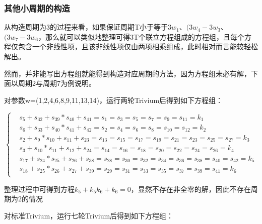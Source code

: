 \subsubsection{其他小周期的构造}

从构造周期为3的过程来看，如果保证周期T小于等于$3w_{1}$、$(3w_{4}-3w_{3}$、$(3w_{7}-3w_{6}$，那么就可以类似地整理可得3T个联立方程组成的方程组，且每个方程仅包含一个非线性项，且该非线性项仅由两项相乘组成，此时相对而言能较轻松解出。

然而，并非能写出方程组就能得到构造对应周期的方法，因为方程组未必有解，下面以周期2与周期7为例说明。

\vspace{3ex}

对参数w=(1,2,4,6,8,9,11,13,14)，运行两轮Trivium后得到如下方程组：

\begin{equation}
\left\{
\begin{aligned}
&s_{5}+s_{32}+s_{39}*s_{40}+s_{41}=s_{1}=s_{3}=s_{5}=s_{7}=s_{9}=s_{11}=k_{1}\\
&s_{6}+s_{33}+s_{40}*s_{41}+s_{42}=s_{2}=s_{4}=s_{6}=s_{8}=s_{10}=s_{12}=k_{2}\\
&s_{2}+s_{9}*s_{10}+s_{11}+s_{23}=s_{13}=s_{15}=s_{17}=s_{19}=s_{21}=s_{23}=s_{25}=s_{27}=k_{3}\\
&s_{3}+s_{10}*s_{11}+s_{12}+s_{24}=s_{14}=s_{16}=s_{18}=s_{20}=s_{22}=s_{24}=s_{26}=k_{4}\\
&s_{17}+s_{24}*s_{25}+s_{26}+s_{38}=s_{28}=s_{30}=s_{32}=s_{34}=s_{36}=s_{38}=s_{40}=s_{42}=k_{5}\\
&s_{18}+s_{25}*s_{26}+s_{27}+s_{39}=s_{29}=s_{31}=s_{33}=s_{35}=s_{37}=s_{39}=s_{41}=k_{6}\\
\end{aligned}
\right.
\end{equation}

整理过程中可得到方程$k_{5}+k_{5}k_{6}+k_{6}=0$，显然不存在非全零的解，因此不存在周期为2的情况

\vspace{3ex}

对标准Trivium，运行七轮Trivium后得到如下方程组：

